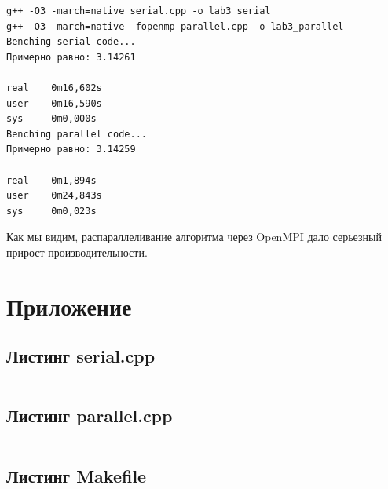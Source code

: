 \documentclass[a4paper,14pt]{extarticle}
\begin{document}
\begin{verbatim}
g++ -O3 -march=native serial.cpp -o lab3_serial
g++ -O3 -march=native -fopenmp parallel.cpp -o lab3_parallel
Benching serial code...
Примерно равно: 3.14261

real    0m16,602s
user    0m16,590s
sys     0m0,000s
Benching parallel code...
Примерно равно: 3.14259

real    0m1,894s
user    0m24,843s
sys     0m0,023s

\end{verbatim}

Как мы видим, распараллеливание алгоритма через OpenMPI дало серьезный прирост производительности.

\section*{Приложение}

\subsection*{Листинг serial.cpp}
\inputminted[mathescape,linenos,breaklines]{c++}{../src/serial.cpp}

\subsection*{Листинг parallel.cpp}
\inputminted[mathescape,linenos,breaklines]{c++}{../src/parallel.cpp}

\subsection*{Листинг Makefile}
\label{makefile}
\inputminted[mathescape,linenos,breaklines]{make}{../src/Makefile}
\end{document}
